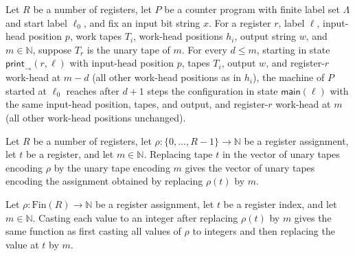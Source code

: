 \begin{theorem}
\label{Complexity.CounterProg.back_walk}
\leanok
{}
Let $R$ be a number of registers, let $P$ be a counter program with finite label set
$\Lambda$ and start label $\ell_0$, and fix an input bit string $x$. For a register $r$,
label $\ell$, input-head position $p$, work tapes $T_i$, work-head positions $h_i$,
output string $w$, and $m\in\mathbb N$, suppose $T_r$ is the unary tape of $m$. For
every $d\le m$, starting in state $\mathsf{print}_{\rightarrow}(r,\ell)$ with input-head
position $p$, tapes $T_i$, output $w$, and register-$r$ work-head at $m-d$ (all other
work-head positions as in $h_i$), the machine of $P$ started at $\ell_0$ reaches after
$d+1$ steps the configuration in state $\mathsf{main}(\ell)$ with the same input-head
position, tapes, and output, and register-$r$ work-head at $m$ (all other work-head
positions unchanged).
\end{theorem}

\begin{theorem}
\label{Complexity.CounterProg.tapes_update}
\leanok
{}
Let $R$ be a number of registers, let $\rho : \{0,\ldots,R-1\} \to \mathbb{N}$ be a
register assignment, let $t$ be a register, and let $m \in \mathbb{N}$. Replacing tape
$t$ in the vector of unary tapes encoding $\rho$ by the unary tape encoding $m$ gives
the vector of unary tapes encoding the assignment obtained by replacing $\rho(t)$ by
$m$.
\end{theorem}

\begin{theorem}
\label{Complexity.CounterProg.heads_update}
\leanok
{}
Let $\rho:\mathrm{Fin}(R)\to\mathbb{N}$ be a register assignment, let $t$ be a register
index, and let $m\in\mathbb{N}$. Casting each value to an integer after replacing
$\rho(t)$ by $m$ gives the same function as first casting all values of $\rho$ to
integers and then replacing the value at $t$ by $m$.
\end{theorem}


